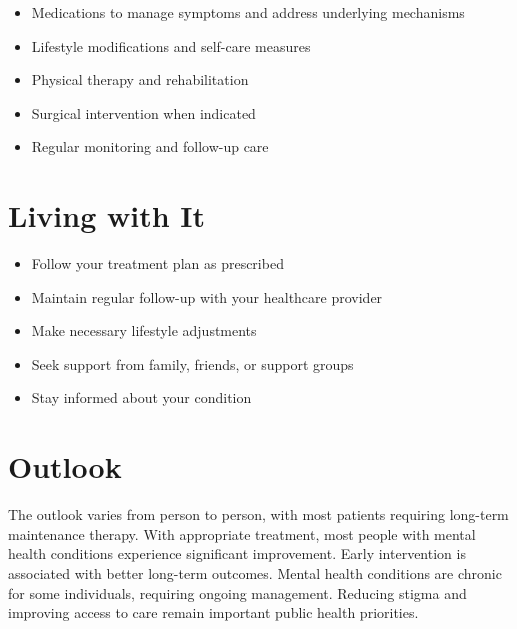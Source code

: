 \begin{itemize}[noitemsep]
  \item Medications to manage symptoms and address underlying mechanisms
  \item Lifestyle modifications and self-care measures
  \item Physical therapy and rehabilitation
  \item Surgical intervention when indicated
  \item Regular monitoring and follow-up care
\end{itemize}
\section{Living with It}
\begin{itemize}[noitemsep]
  \item Follow your treatment plan as prescribed
  \item Maintain regular follow-up with your healthcare provider
  \item Make necessary lifestyle adjustments
  \item Seek support from family, friends, or support groups
  \item Stay informed about your condition
\end{itemize}
\section{Outlook}
The outlook varies from person to person, with most patients requiring long-term maintenance therapy. With appropriate treatment, most people with mental health conditions experience significant improvement. Early intervention is associated with better long-term outcomes. Mental health conditions are chronic for some individuals, requiring ongoing management. Reducing stigma and improving access to care remain important public health priorities.

